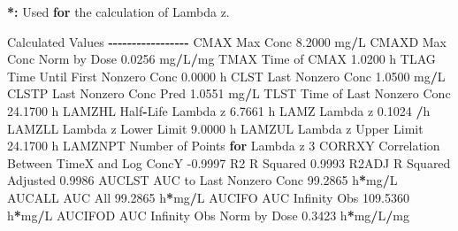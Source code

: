 \documentclass[
  12pt,
]{krantz}
\newenvironment{Shaded}{\begin{snugshade}}{\end{snugshade}}
\newcommand{\ControlFlowTok}[1]{\textcolor[rgb]{0.13,0.29,0.53}{\textbf{#1}}}
\newcommand{\DecValTok}[1]{\textcolor[rgb]{0.00,0.00,0.81}{#1}}
\newcommand{\ErrorTok}[1]{\textcolor[rgb]{0.64,0.00,0.00}{\textbf{#1}}}
\newcommand{\FloatTok}[1]{\textcolor[rgb]{0.00,0.00,0.81}{#1}}
\newcommand{\NormalTok}[1]{#1}
\newcommand{\OperatorTok}[1]{\textcolor[rgb]{0.81,0.36,0.00}{\textbf{#1}}}
\newcommand{\StringTok}[1]{\textcolor[rgb]{0.31,0.60,0.02}{#1}}
\begin{document}
\begin{Shaded}
\begin{Highlighting}[]
\OperatorTok{*}\ErrorTok{:}\StringTok{ }\NormalTok{Used }\ControlFlowTok{for}\NormalTok{ the calculation of Lambda z.}


\NormalTok{Calculated Values}
\OperatorTok{{-}{-}{-}{-}{-}{-}{-}{-}{-}{-}{-}{-}{-}{-}{-}{-}{-}}
\NormalTok{CMAX       Max Conc                                        }\FloatTok{8.2000}\NormalTok{ mg}\OperatorTok{/}\NormalTok{L}
\NormalTok{CMAXD      Max Conc Norm by Dose                           }\FloatTok{0.0256}\NormalTok{ mg}\OperatorTok{/}\NormalTok{L}\OperatorTok{/}\NormalTok{mg}
\NormalTok{TMAX       Time of CMAX                                    }\FloatTok{1.0200}\NormalTok{ h}
\NormalTok{TLAG       Time Until First Nonzero Conc                   }\FloatTok{0.0000}\NormalTok{ h}
\NormalTok{CLST       Last Nonzero Conc                               }\FloatTok{1.0500}\NormalTok{ mg}\OperatorTok{/}\NormalTok{L}
\NormalTok{CLSTP      Last Nonzero Conc Pred                          }\FloatTok{1.0551}\NormalTok{ mg}\OperatorTok{/}\NormalTok{L}
\NormalTok{TLST       Time of Last Nonzero Conc                      }\FloatTok{24.1700}\NormalTok{ h}
\NormalTok{LAMZHL     Half}\OperatorTok{{-}}\NormalTok{Life Lambda z                              }\FloatTok{6.7661}\NormalTok{ h}
\NormalTok{LAMZ       Lambda z                                        }\FloatTok{0.1024} \OperatorTok{/}\NormalTok{h}
\NormalTok{LAMZLL     Lambda z Lower Limit                            }\FloatTok{9.0000}\NormalTok{ h}
\NormalTok{LAMZUL     Lambda z Upper Limit                           }\FloatTok{24.1700}\NormalTok{ h}
\NormalTok{LAMZNPT    Number of Points }\ControlFlowTok{for}\NormalTok{ Lambda z                   }\DecValTok{3}
\NormalTok{CORRXY     Correlation Between TimeX and Log ConcY        }\FloatTok{{-}0.9997} 
\NormalTok{R2         R Squared                                       }\FloatTok{0.9993} 
\NormalTok{R2ADJ      R Squared Adjusted                              }\FloatTok{0.9986} 
\NormalTok{AUCLST     AUC to Last Nonzero Conc                       }\FloatTok{99.2865}\NormalTok{ h}\OperatorTok{*}\NormalTok{mg}\OperatorTok{/}\NormalTok{L}
\NormalTok{AUCALL     AUC All                                        }\FloatTok{99.2865}\NormalTok{ h}\OperatorTok{*}\NormalTok{mg}\OperatorTok{/}\NormalTok{L}
\NormalTok{AUCIFO     AUC Infinity Obs                              }\FloatTok{109.5360}\NormalTok{ h}\OperatorTok{*}\NormalTok{mg}\OperatorTok{/}\NormalTok{L}
\NormalTok{AUCIFOD    AUC Infinity Obs Norm by Dose                   }\FloatTok{0.3423}\NormalTok{ h}\OperatorTok{*}\NormalTok{mg}\OperatorTok{/}\NormalTok{L}\OperatorTok{/}\NormalTok{mg}

\end{Highlighting}
\end{Shaded}
\end{document}
